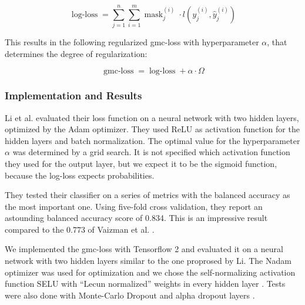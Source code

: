 \begin{equation}
	\operatorname{log-loss} = \sum_{j=1}^{n}\sum_{i=1}^{m} \operatorname{mask}_j^{(i)} \cdot l(y_j^{(i)}, \hat{y}_j^{(i)})
\end{equation}

This results in the following regularized gmc-loss with hyperparameter $\alpha$, that determines the degree of regularization:

\begin{equation}
	\operatorname{gmc-loss} = \operatorname{log-loss} + \alpha \cdot \Omega
\end{equation}

\subsubsection{Implementation and Results}

Li et al. evaluated their loss function on a neural network with two hidden layers, optimized by the Adam optimizer. They used ReLU as activation function for the hidden layers and batch normalization. The optimal value for the hyperparameter $\alpha$ was determined by a grid search. It is not specified which activation function they used for the output layer, but we expect it to be the sigmoid function, because the log-loss expects probabilities.

They tested their classifier on a series of metrics with the balanced accuracy as the most important one. Using five-fold cross validation, they report an astounding balanced accuracy score of 0.834. This is an impressive result compared to the 0.773 of Vaizman et al. \cite{Vaizman18}.

We implemented the gmc-loss with Tensorflow 2 and evaluated it on a neural network with two hidden layers similar to the one proprosed by Li. The Nadam optimizer was used for optimization \cite{Dozat2015} and we chose the self-normalizing activation function SELU with \enquote{Lecun normalized} weights in every hidden layer \cite{Klambauer17}. Tests were also done with Monte-Carlo Dropout and alpha dropout layers \cite{Gal2016}.

